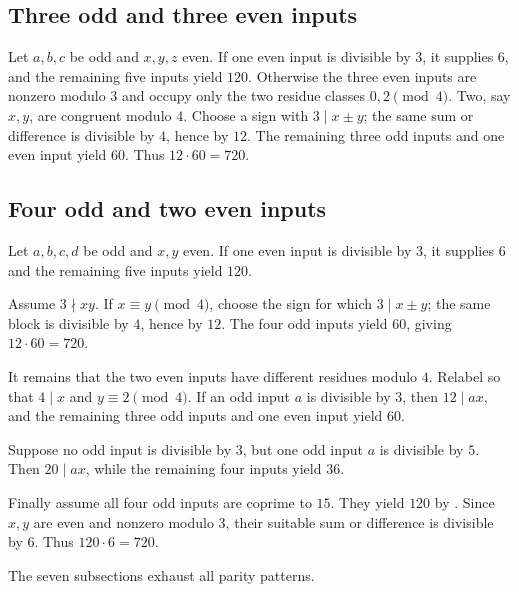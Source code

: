 \subsection{Three odd and three even inputs}\label{app:six3}

Let $a,b,c$ be odd and $x,y,z$ even.  If one even input is divisible by $3$,
it supplies $6$, and the remaining five inputs yield $120$.  Otherwise the
three even inputs are nonzero modulo $3$ and occupy only the two residue
classes $0,2\pmod4$.  Two, say $x,y$, are congruent modulo $4$.  Choose a
sign with $3\mid x\pm y$; the same sum or difference is divisible by $4$,
hence by $12$.  The remaining three odd inputs and one even input yield $60$.
Thus $12\cdot60=720$.

\subsection{Four odd and two even inputs}\label{app:six4}

Let $a,b,c,d$ be odd and $x,y$ even.  If one even input is divisible by $3$,
it supplies $6$ and the remaining five inputs yield $120$.

Assume $3\nmid xy$.  If $x\equiv y\pmod4$, choose the sign for which
$3\mid x\pm y$; the same block is divisible by $4$, hence by $12$.  The
four odd inputs yield $60$, giving $12\cdot60=720$.

It remains that the two even inputs have different residues modulo $4$.
Relabel so that $4\mid x$ and $y\equiv2\pmod4$.
If an odd input $a$ is divisible by $3$, then $12\mid ax$, and the remaining
three odd inputs and one even input yield $60$.

Suppose no odd input is divisible by $3$, but one odd input $a$ is divisible
by $5$.  Then $20\mid ax$, while the remaining four inputs yield $36$.

Finally assume all four odd inputs are coprime to $15$.  They yield $120$ by
.  Since $x,y$ are even and nonzero modulo $3$, their
suitable sum or difference is divisible by $6$.  Thus $120\cdot6=720$.

The seven subsections exhaust all parity patterns.
